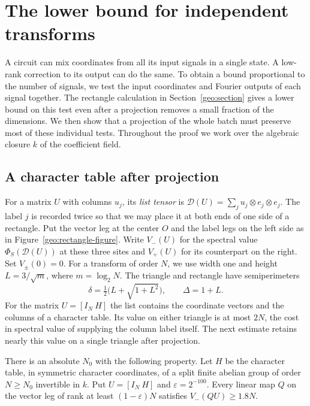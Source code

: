 \section{The lower bound for independent transforms}\label{bch:proof:section}

A circuit can mix coordinates from all its input signals in a single
state. A low-rank correction to its output can do the same. To obtain
a bound proportional to the number of signals, we test the input
coordinates and Fourier outputs of each signal together. The rectangle
calculation in Section~\ref{geo:section} gives a lower bound on this
test even after a projection removes a small fraction of the dimensions.
We then show that a projection of the whole batch must preserve most
of these individual tests. Throughout the proof we work over the
algebraic closure $k$ of the coefficient field.

\subsection{A character table after projection}

For a matrix $U$ with columns $u_j$, its \emph{list tensor} is
$\mathcal D(U)=\sum_j u_j\otimes e_j\otimes e_j$. The label $j$ is
recorded twice so that we may place it at both ends of one side of a
rectangle. Put the vector leg at the center $O$ and the label legs on
the left side as in Figure~\ref{geo:rectangle-figure}. Write $V_-(U)$
for the spectral value $\Phi_S(\mathcal D(U))$ at these three sites
and $V_+(U)$ for its counterpart on the right. Set $V_\pm(0)=0$.
For a transform of order $N$, we use width one and height $L=3/\sqrt m$,
where $m=\log_2 N$. The triangle and rectangle have semiperimeters
\[
 \delta=\tfrac12\bigl(L+\sqrt{1+L^2}\bigr),
 \qquad \Delta=1+L .
\]
For the matrix $U=[I_N\ H]$ the list contains the coordinate vectors
and the columns of a character table. Its value on either triangle
is at most $2N$, the cost in spectral value of supplying the column
label itself. The next estimate retains nearly this value on a single
triangle after projection.

\begin{lemma}\label{bch:projected-list}
There is an absolute $N_0$ with the following property. Let $H$ be
the character table, in symmetric character coordinates, of a split
finite abelian group of order $N\ge N_0$ invertible in $k$. Put
$U=[I_N\ H]$ and $\varepsilon=2^{-100}$. Every linear map $Q$ on
the vector leg of rank at least $(1-\varepsilon)N$ satisfies
$V_-(QU)\ge1.8N$.
\end{lemma}

